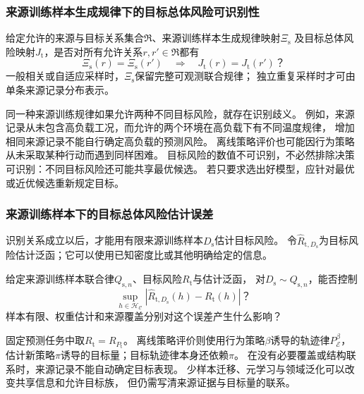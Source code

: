 \subsubsection{来源训练样本生成规律下的目标总体风险可识别性}
\label{sec:future-analysis-source-target}

\begin{mathproblem}[来源训练规律是否确定目标总体风险]
  \label{question:future-source-target}
  给定允许的来源与目标关系集合$\mathfrak R$、来源训练样本生成规律映射$\Xi_{\mathrm s}$
  及目标总体风险映射$J_{\mathrm t}$，是否对所有允许关系$r,r'\in\mathfrak R$都有
  \[
    \Xi_{\mathrm s}(r)=\Xi_{\mathrm s}(r')
    \quad\Longrightarrow\quad J_{\mathrm t}(r)=J_{\mathrm t}(r')\text{？}
  \]
  一般相关或自适应采样时，$\Xi_{\mathrm s}$保留完整可观测联合规律；
  独立重复采样时才可由单条来源记录分布表示。
\end{mathproblem}

同一种来源训练规律如果允许两种不同目标风险，就存在识别歧义。
例如，来源记录从未包含高负载工况，而允许的两个环境在高负载下有不同温度规律，
增加相同来源记录不能自行确定高负载的预测风险。
离线策略评价也可能因行为策略从未采取某种行动而遇到同样困难。
目标风险的数值不可识别，不必然排除决策可识别：不同目标风险还可能共享最优候选。
若只要求选出好模型，应针对最优或近优候选重新规定目标。

\subsubsection{来源训练样本下的目标总体风险估计误差}
\label{sec:future-analysis-source-target-estimation}

识别关系成立以后，才能用有限来源训练样本$D_{\mathrm s}$估计目标风险。
令$\widehat R_{\mathrm t,D_{\mathrm s}}$为目标风险估计泛函；它可以使用已知密度比或其他明确给定的信息。

\begin{mathproblem}[有限来源训练样本的目标风险误差]
  \label{question:future-source-target-estimation}
  给定来源训练样本联合律$Q_{{\mathrm s},n}$、目标风险$R_{\mathrm t}$与估计泛函，
  对$D_{\mathrm s}\sim Q_{{\mathrm s},n}$，能否控制
  \[
    \sup_{h\in\mathcal H_{\mathcal C}}
    |\widehat R_{\mathrm t,D_{\mathrm s}}(h)-R_{\mathrm t}(h)|\text{？}
  \]
  样本有限、权重估计和来源覆盖分别对这个误差产生什么影响？
\end{mathproblem}



固定预测任务中取$R_{\mathrm t}=R_{P_{\mathrm t}}$。
离线策略评价则使用行为策略$\beta$诱导的轨迹律$P_{\mathcal E}^{\beta}$，
估计新策略$\pi$诱导的目标量；目标轨迹律本身还依赖$\pi$。
在没有必要覆盖或结构联系时，来源记录不能自动确定目标表现。
少样本迁移、元学习与领域泛化可以改变共享信息和允许目标族，
但仍需写清来源证据与目标量的联系。

